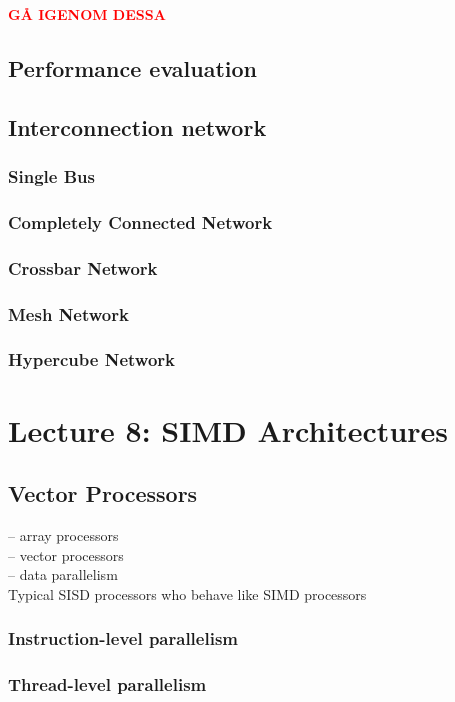 \documentclass[titlepage, a4paper]{article}
\newcommand{\todo}[1] {\textbf{\textcolor{red}{#1}}}
\begin{document}
\todo{GÅ IGENOM DESSA}\\

\subsection{Performance evaluation}

\subsection{Interconnection network}
\subsubsection{Single Bus}
\subsubsection{Completely Connected Network}
\subsubsection{Crossbar Network}
\subsubsection{Mesh Network}
\subsubsection{Hypercube Network}

\section{Lecture 8: SIMD Architectures}

\subsection{Vector Processors}
-- array processors \\
-- vector processors \\
-- data parallelism \\
Typical SISD processors who behave like SIMD processors

\subsubsection{Instruction-level parallelism}
\subsubsection{Thread-level parallelism}
\end{document}
